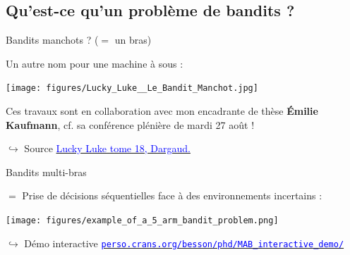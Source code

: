 \documentclass[11pt,french,ignorenonframetext,]{beamer}
\begin{document}
\subsection{\hfill{}Qu'est-ce qu'un problème de bandits ?\hfill{}}

\begin{frame}{Bandits manchots ? ($=$ un bras)}

  Un autre nom pour une machine à sous :

  \begin{center}
    \texttt{[image: figures/Lucky\_Luke\_\_Le\_Bandit\_Manchot.jpg]}
  \end{center}

  Ces travaux sont en collaboration avec mon encadrante de thèse \textbf{Émilie Kaufmann}, cf. sa conférence plénière de mardi 27 août !

  \begin{tiny}
  $\hookrightarrow$ Source
    \href{https://www.dargaud.com/bd/LUCKY-LUKE/Lucky-Luke/Lucky-Luke-tome-18-Bandit-manchot-Le}{\textcolor{blue}{Lucky Luke tome 18, \textcopyright{} Dargaud.}}
  \end{tiny}

\end{frame}


\begin{frame}{Bandits multi-bras}

  $=$ Prise de décisions séquentielles face à des environnements incertains :

  \begin{center}
    \texttt{[image: figures/example\_of\_a\_5\_arm\_bandit\_problem.png]}
  \end{center}

  \begin{tiny}
  $\hookrightarrow$ Démo interactive
    \href{https://perso.crans.org/besson/phd/MAB_interactive_demo/}{\textcolor{blue}{\texttt{perso.crans.org/besson/phd/MAB\_interactive\_demo/}}}
  \end{tiny}

\end{frame}
\end{document}
